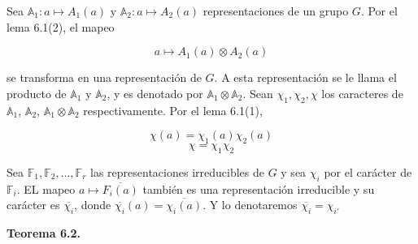 \documentclass[12pt]{book}
\theoremstyle{definition}
\newcounter{in}
\begin{document}
Sea $\mathbb{A}_{1} \colon a \mapsto A_{1}(a)$ y
$\mathbb{A}_{2} \colon a \mapsto A_{2}(a)$ representaciones de un
grupo $G$. Por el lema 6.1(2), el mapeo

\begin{equation*}
  a \mapsto A_{1}(a) \otimes A_{2}(a)
\end{equation*}

se transforma en una representación de $G$. A esta representación se le llama el producto de $\mathbb{A}_{1}$ y $\mathbb{A}_{2}$, y es denotado por $\mathbb{A}_{1} \otimes \mathbb{A}_{2}$. Sean $\chi_{1}, \chi_2, \chi$ los caracteres de $\mathbb{A}_{1}$, $\mathbb{A}_{2}$, $\mathbb{A}_{1} \otimes \mathbb{A}_{2}$ respectivamente. Por el lema 6.1(1),

\begin{equation*}
  \chi(a)=\chi_{1}(a) \chi_{2}(a)
\end{equation*}
\begin{equation*}
  \chi = \chi_{1} \chi_{2}
\end{equation*}

Sea $\mathbb{F}_{1}, \mathbb{F}_{2}, \ldots, \mathbb{F}_{r}$ las representaciones irreducibles de $G$ y sea $\chi_{i}$ por el carácter de $\mathbb{F}_{i}$. EL mapeo $a \mapsto \overline{F_{i}(a)}$ también es una representación irreducible y su carácter es $\overline{\chi_{i}}$, donde $\overline{\chi_{i}}(a) = \overline{\chi_{i}(a)}$. Y lo denotaremos $\overline{\chi_{i}}=\chi_{i'}$

\textbf{Teorema 6.2. }


\backmatter





\printindex
\end{document}
